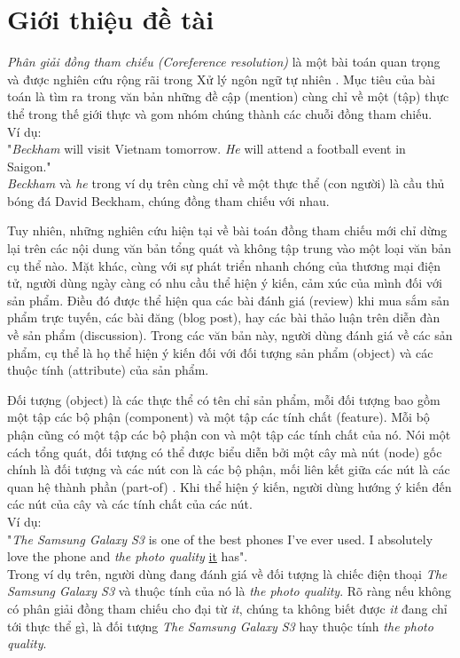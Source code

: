 \documentclass[12pt]{report}
\begin{document}
	\chapter{Giới thiệu đề tài}	
		\label{introduction_chapter}
		\par \textit{Phân giải đồng tham chiếu (Coreference resolution)} là một bài toán quan trọng và được nghiên cứu rộng rãi trong Xử lý ngôn ngữ tự nhiên \cite{mainpaper}. Mục tiêu của bài toán là tìm ra trong văn bản những đề cập (mention) cùng chỉ về một (tập) thực thể trong thế giới thực và gom nhóm chúng thành các chuỗi đồng tham chiếu.\\
		Ví dụ: \\
		"\textit{Beckham} will visit Vietnam tomorrow. \textit{He} will attend a football event in Saigon."\\
		\textit{Beckham} và \textit{he} trong ví dụ trên cùng chỉ về một thực thể (con người) là cầu thủ bóng đá David Beckham, chúng đồng tham chiếu với nhau.
		\par Tuy nhiên, những nghiên cứu hiện tại về bài toán đồng tham chiếu mới chỉ dừng lại trên các nội dung văn bản tổng quát và không tập trung vào một loại văn bản cụ thể nào. Mặt khác, cùng với sự phát triển nhanh chóng của thương mại điện tử, người dùng ngày càng có nhu cầu thể hiện ý kiến, cảm xúc của mình đối với sản phẩm. Điều đó được thể hiện qua các bài đánh giá (review) khi mua sắm sản phẩm trực tuyến, các bài đăng (blog post), hay các bài thảo luận trên diễn đàn về sản phẩm (discussion). Trong các văn bản này, người dùng đánh giá về các sản phẩm, cụ thể là họ thể hiện ý kiến đối với đối tượng sản phẩm (object) và các thuộc tính (attribute) của sản phẩm. 
		\par Đối tượng (object) là các thực thể có tên chỉ sản phẩm, mỗi đối tượng bao gồm một tập các bộ phận (component) và một tập các tính chất (feature). Mỗi bộ phận cũng có một tập các bộ phận con và một tập các tính chất của nó. Nói một cách tổng quát, đối tượng có thể được biểu diễn bởi một cây mà nút (node) gốc chính là đối tượng và các nút con là các bộ phận, mối liên kết giữa các nút là các quan hệ thành phần (part-of) \cite{sentiment}. Khi thể hiện ý kiến, người dùng hướng ý kiến đến các nút của cây và các tính chất của các nút.\\
		Ví dụ:\\
		"\textit{The Samsung Galaxy S3} is one of the best phones I've ever used. I absolutely love the phone and \textit{the photo quality} \underline{it} has".\\
		Trong ví dụ trên, người dùng đang đánh giá về đối tượng là chiếc điện thoại \textit{The Samsung Galaxy S3} và thuộc tính của nó là \textit{the photo quality}. Rõ ràng nếu không có phân giải đồng tham chiếu cho đại từ \textit{it}, chúng ta không biết được \textit{it} đang chỉ tới thực thể gì, là đối tượng \textit{The Samsung Galaxy S3} hay thuộc tính \textit{the photo quality}.
\end{document}
